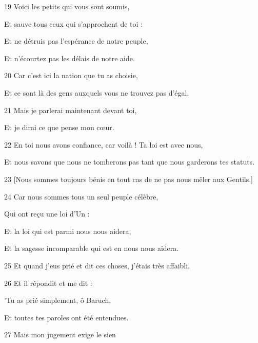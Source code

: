 \par 19 Voici les petits qui vous sont soumis,

\par Et sauve tous ceux qui s'approchent de toi :

\par Et ne détruis pas l'espérance de notre peuple,

\par Et n'écourtez pas les délais de notre aide.

\par 20 Car c'est ici la nation que tu as choisie,

\par Et ce sont là des gens auxquels vous ne trouvez pas d'égal.

\par 21 Mais je parlerai maintenant devant toi,

\par Et je dirai ce que pense mon cœur.

\par 22 En toi nous avons confiance, car voilà ! Ta loi est avec nous,

\par Et nous savons que nous ne tomberons pas tant que nous garderons tes statuts.

\par 23 [Nous sommes toujours bénis en tout cas de ne pas nous mêler aux Gentils.]

\par 24 Car nous sommes tous un seul peuple célèbre,

\par Qui ont reçu une loi d'Un :

\par Et la loi qui est parmi nous nous aidera,

\par Et la sagesse incomparable qui est en nous nous aidera.

\par 25 Et quand j'eus prié et dit ces choses, j'étais très affaibli.

\par 26 Et il répondit et me dit :

\par 'Tu as prié simplement, ô Baruch,

\par Et toutes tes paroles ont été entendues.

\par 27 Mais mon jugement exige le sien

